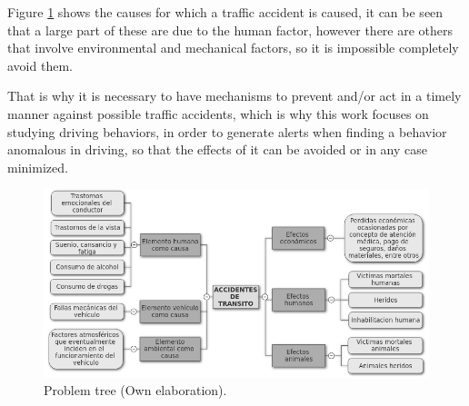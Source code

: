 \vspace{5mm} %

Figure \ref{fig:arbol} shows the causes for which a traffic accident is caused, it can be seen that a large part of these are due to the human factor, however there are others that involve environmental and mechanical factors, so it is impossible completely avoid them.

\vspace{5mm} %

That is why it is necessary to have mechanisms to prevent and/or act in a timely manner against possible traffic accidents, which is why this work focuses on studying driving behaviors, in order to generate alerts when finding a behavior anomalous in driving, so that the effects of it can be avoided or in any case minimized.

\begin{figure}[h!]
  \begin{center}	\includegraphics[width=1.0\textwidth, fbox]{imagenes/Cap1/arbol_p}
  \caption{Problem tree (Own elaboration).}
  \label{fig:arbol}
  \end{center}
\end{figure}



